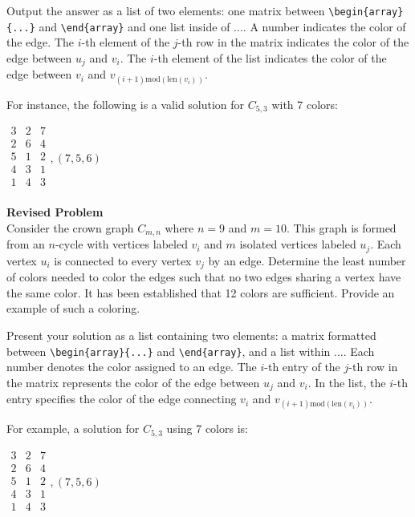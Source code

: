 Output the answer as a list of two elements: one matrix between \verb|\begin{array}{...}| and \verb|\end{array}| and one list inside of $\boxed{...}$. A number indicates the color of the edge. The $i$-th element of the $j$-th row in the matrix indicates the color of the edge between $u_j$ and $v_i$. The $i$-th element of the list indicates the color of the edge between $v_i$ and $v_{(i+1) \text{mod}(\text{len}(v_i))}$.

For instance, the following is a valid solution for $C_{{5, 3}}$ with 7 colors:

$\boxed{
\begin{array}{ccc}
3 & 2 & 7 \\
2 & 6 & 4 \\
5 & 1 & 2 \\
4 & 3 & 1 \\
1 & 4 & 3 \\
\end{array},
(7, 5, 6)
}$



\textbf{Revised Problem}\\
Consider the crown graph $C_{m, n}$ where $n = 9$ and $m = 10$. This graph is formed from an $n$-cycle with vertices labeled $v_i$ and $m$ isolated vertices labeled $u_j$. Each vertex $u_i$ is connected to every vertex $v_j$ by an edge. Determine the least number of colors needed to color the edges such that no two edges sharing a vertex have the same color. It has been established that 12 colors are sufficient. Provide an example of such a coloring.

Present your solution as a list containing two elements: a matrix formatted between \verb|\begin{array}{...}| and \verb|\end{array}|, and a list within $\boxed{...}$. Each number denotes the color assigned to an edge. The $i$-th entry of the $j$-th row in the matrix represents the color of the edge between $u_j$ and $v_i$. In the list, the $i$-th entry specifies the color of the edge connecting $v_i$ and $v_{(i+1) \text{mod}(\text{len}(v_i))}$.

For example, a solution for $C_{{5, 3}}$ using 7 colors is:

$\boxed{
\begin{array}{ccc}
3 & 2 & 7 \\
2 & 6 & 4 \\
5 & 1 & 2 \\
4 & 3 & 1 \\
1 & 4 & 3 \\
\end{array},
(7, 5, 6)
}$

